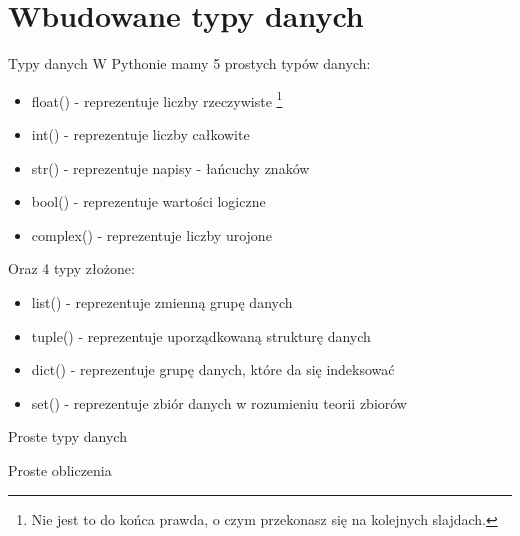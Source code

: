 \usepackage{graphicx}


\section{Wbudowane typy danych}\label{sec:data_types}
\begin{frame}{Typy danych}
    W Pythonie mamy 5 prostych typów danych:
    \begin{itemize}
        \item float() - reprezentuje liczby rzeczywiste \footnote{Nie jest to do końca prawda, o czym przekonasz się na kolejnych slajdach.} \\
        \item int() - reprezentuje liczby całkowite \\
        \item str() - reprezentuje napisy - łańcuchy znaków \\
        \item bool() - reprezentuje wartości logiczne \\
        \item complex() - reprezentuje liczby urojone \\
    \end{itemize}
    Oraz 4 typy złożone:
    \begin{itemize}
        \item list() - reprezentuje zmienną grupę danych \\
        \item tuple() - reprezentuje uporządkowaną strukturę danych \\
        \item dict() - reprezentuje grupę danych, które da się indeksować \\
        \item set() - reprezentuje zbiór danych w rozumieniu teorii zbiorów \\
    \end{itemize}
\end{frame}
\begin{frame}{Proste typy danych}
    
\end{frame}
\begin{frame}{Proste obliczenia}
    
\end{frame}

